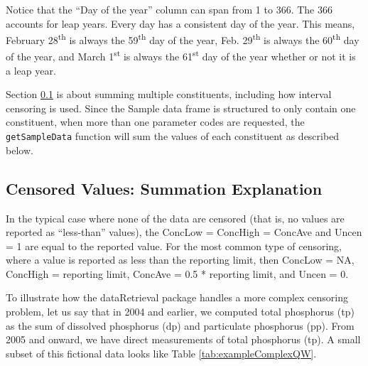 \documentclass[a4paper,11pt]{article}\usepackage[]{graphicx}\usepackage[]{color}
\begin{document}
Notice that the \enquote{Day of the year} column can span from 1 to 366. The 366 accounts for leap years. Every day has a consistent day of the year. This means, February 28\textsuperscript{th} is always the 59\textsuperscript{th} day of the year, Feb. 29\textsuperscript{th} is always the 60\textsuperscript{th} day of the year, and March 1\textsuperscript{st} is always the 61\textsuperscript{st} day of the year whether or not it is a leap year.

Section \ref{sec:cenValues} is about summing multiple constituents, including how interval censoring is used. Since the Sample data frame is structured to only contain one constituent, when more than one parameter codes are requested, the \texttt{getSampleData} function will sum the values of each constituent as described below.

\FloatBarrier


\subsection{Censored Values: Summation Explanation}
\label{sec:cenValues}
In the typical case where none of the data are censored (that is, no values are reported as \enquote{less-than} values), the ConcLow = ConcHigh = ConcAve and Uncen = 1 are equal to the reported value.  For the most common type of censoring, where a value is reported as less than the reporting limit, then ConcLow = NA, ConcHigh = reporting limit, ConcAve = 0.5 * reporting limit, and Uncen = 0.

To illustrate how the dataRetrieval package handles a more complex censoring problem, let us say that in 2004 and earlier, we computed total phosphorus (tp) as the sum of dissolved phosphorus (dp) and particulate phosphorus (pp). From 2005 and onward, we have direct measurements of total phosphorus (tp). A small subset of this fictional data looks like Table \ref{tab:exampleComplexQW}.
\end{document}
